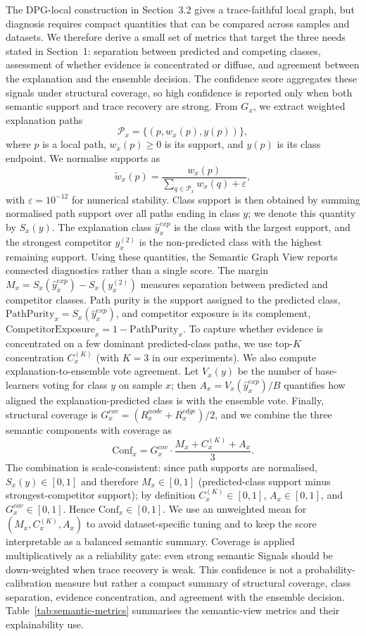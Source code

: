 \documentclass[runningheads]{llncs}
\begin{document}
The DPG-local construction in Section~3.2 gives a trace-faithful local graph,
but diagnosis requires compact quantities that can be compared across samples
and datasets. We therefore derive a small set of metrics that target the three
needs stated in Section~1: separation between predicted and competing classes,
assessment of whether evidence is concentrated or diffuse, and agreement between
the explanation and the ensemble decision. The confidence score aggregates these
signals under structural coverage, so high confidence is reported only when both
semantic support and trace recovery are strong.
From $G_x$, we extract weighted explanation paths
\[
\mathcal{P}_x=\{(p,w_x(p),y(p))\},
\]
where $p$ is a local path, $w_x(p)\ge 0$ is its support, and $y(p)$ is its
class endpoint. We normalise supports as
\[
\tilde{w}_x(p)=\frac{w_x(p)}{\sum_{q\in\mathcal{P}_x} w_x(q)+\varepsilon},
\]
with $\varepsilon=10^{-12}$ for numerical stability. Class support is then obtained by summing normalised path support over all paths ending in class $y$; we denote this quantity by $S_x(y)$. The explanation class $\hat{y}^{exp}_x$ is the class with the largest support, and the strongest competitor $y_x^{(2)}$ is the non-predicted class with the highest remaining support. 
Using these quantities, the Semantic Graph View reports connected diagnostics rather than a single score. The margin $M_x=S_x(\hat{y}^{exp}_x)-S_x(y_x^{(2)})$ measures separation between predicted and competitor classes. Path purity is the support assigned to the predicted class, $\mathrm{PathPurity}_x=S_x(\hat{y}^{exp}_x)$, and competitor exposure is its complement, $\mathrm{CompetitorExposure}_x=1-\mathrm{PathPurity}_x$. To capture whether evidence is concentrated on a few dominant predicted-class paths, we use top-$K$ concentration $C_x^{(K)}$ (with $K=3$ in our
experiments).
We also compute explanation-to-ensemble vote agreement. Let $V_x(y)$ be the number of base-learners voting for class $y$ on sample $x$; then $A_x=V_x(\hat{y}^{exp}_x)/B$ quantifies how aligned the explanation-predicted class is with the ensemble vote. Finally, structural coverage is $G_x^{cov}=(R_x^{node}+R_x^{edge})/2$, and we combine the three semantic components with coverage as
\[
\mathrm{Conf}_x=G_x^{cov}\cdot\frac{M_x+C_x^{(K)}+A_x}{3}.
\]
The combination is scale-consistent: since path supports are normalised, $S_x(y)\in[0,1]$ and therefore $M_x\in[0,1]$ (predicted-class support minus strongest-competitor support); by definition $C_x^{(K)}\in[0,1]$,
$A_x\in[0,1]$, and $G_x^{cov}\in[0,1]$. Hence $\mathrm{Conf}_x\in[0,1]$.
We use an unweighted mean for $(M_x,C_x^{(K)},A_x)$ to avoid dataset-specific tuning and to keep the score interpretable as a balanced semantic summary.
Coverage is applied multiplicatively as a reliability gate: even strong semantic Signals should be down-weighted when trace recovery is weak. This confidence is not a probability-calibration measure but rather a compact summary of structural coverage, class separation, evidence concentration, and agreement with the
ensemble decision.
Table~\ref{tab:semantic-metrics} summarises the semantic-view metrics and their explainability use.
\end{document}

